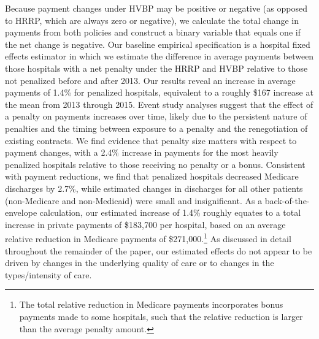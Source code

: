\documentclass[12pt]{article}
\begin{document}
Because payment changes under HVBP may be positive or negative (as opposed to HRRP, which are always zero or negative), we calculate the total change in payments from both policies and construct a binary variable that equals one if the net change is negative.  Our baseline empirical specification is a hospital fixed effects estimator in which we estimate the difference in average payments between those hospitals with a net penalty under the HRRP and HVBP relative to those not penalized before and after 2013. Our results reveal an increase in average payments of 1.4\% for penalized hospitals, equivalent to a roughly \$167 increase at the mean from 2013 through 2015. Event study analyses suggest that the effect of a penalty on payments increases over time, likely due to the persistent nature of penalties and the timing between exposure to a penalty and the renegotiation of existing contracts.  We find evidence that penalty size matters with respect to payment changes, with a 2.4$\%$ increase in payments for the most heavily penalized hospitals relative to those receiving no penalty or a bonus. Consistent with payment reductions, we find that penalized hospitals decreased Medicare discharges by 2.7\%, while estimated changes in discharges for all other patients (non-Medicare and non-Medicaid) were small and insignificant. As a back-of-the-envelope calculation, our estimated increase of 1.4\% roughly equates to a total increase in private payments of \$183,700 per hospital, based on an average relative reduction in Medicare payments of \$271,000.\footnote{The total relative reduction in Medicare payments incorporates bonus payments made to some hospitals, such that the relative reduction is larger than the average penalty amount.} As discussed in detail throughout the remainder of the paper, our estimated effects do not appear to be driven by changes in the underlying quality of care or to changes in the types/intensity of care.
\end{document}
